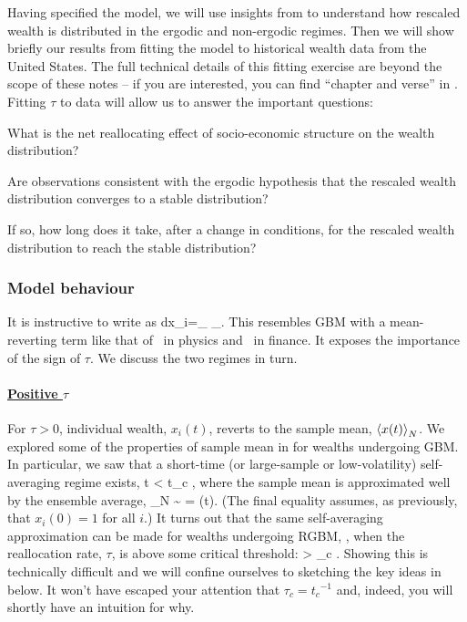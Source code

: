 Having specified the model, we will use insights from  to understand how rescaled wealth is distributed in the ergodic and non-ergodic regimes. Then we will show briefly our results from fitting the model to historical wealth data from the United States. The full technical details of this fitting exercise are beyond the scope of these notes -- if you are interested, you can find ``chapter and verse'' in \cite{BermanPetersAdamou2017}. Fitting $\tau$ to data will allow us to answer the important questions:
\bi
\item
What is the net reallocating effect of socio-economic structure on the wealth distribution?
\item
Are observations consistent with the ergodic hypothesis that the rescaled wealth distribution converges to a stable distribution?
\item
If so, how long does it take, after a change in conditions, for the rescaled wealth distribution to reach the stable distribution?
\ei


\subsubsection{Model behaviour}
It is instructive to write  as
\be
dx_i=_{} \;\; _{}.
\ee
This resembles GBM with a mean-reverting term like that of~\cite{UhlenbeckOrnstein1930} in physics and~\cite{Vasicek1977} in finance. It exposes the importance of the sign of $\tau$. We discuss the two regimes in turn.

\paragraph{\underline{Positive $\tau$}}
\mbox{}

For $\tau>0$, individual wealth, $x_i(t)$, reverts to the sample mean, $\left\langle x(t) \right\rangle_N$. We explored some of the properties of sample mean in  for wealths undergoing GBM. In particular, we saw that a short-time (or large-sample or low-volatility) self-averaging regime exists,
\be
t < t_c \equiv {},
\ee
where the sample mean is approximated well by the ensemble average,
\be
{}_N \sim {} = \exp(\mu t).
\ee
(The final equality assumes, as previously, that $x_i(0)=1$ for all $i$.) It turns out that the same self-averaging approximation can be made for wealths undergoing RGBM, , when the reallocation rate, $\tau$, is above some critical threshold:
\be
\tau > \tau_c \equiv {}.
\ee
Showing this is technically difficult \cite{Bouchaud2015b} and we will confine ourselves to sketching the key ideas in  below. It won't have escaped your attention that $\tau_c={t_c}^{-1}$ and, indeed, you will shortly have an intuition for why. 

